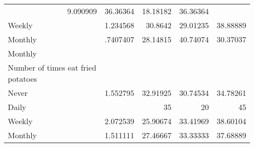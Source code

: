 \documentclass{article}
\begin{document}
\begin{tabular}{lllll}
  \multicolumn{1}{|r}{9.090909} &
  \multicolumn{1}{r}{36.36364} &
  \multicolumn{1}{r}{18.18182} &
  \multicolumn{1}{r}{36.36364} \\
\multicolumn{1}{l}{\hspace{5em}Weekly} &
  \multicolumn{1}{|r}{1.234568} &
  \multicolumn{1}{r}{30.8642} &
  \multicolumn{1}{r}{29.01235} &
  \multicolumn{1}{r}{38.88889} \\
\multicolumn{1}{l}{\hspace{5em}Monthly} &
  \multicolumn{1}{|r}{.7407407} &
  \multicolumn{1}{r}{28.14815} &
  \multicolumn{1}{r}{40.74074} &
  \multicolumn{1}{r}{30.37037} \\
\multicolumn{1}{l}{\hspace{3em}Monthly} &
  \multicolumn{1}{|r}{} &
  \multicolumn{1}{r}{} &
  \multicolumn{1}{r}{} &
  \multicolumn{1}{r}{} \\
\multicolumn{1}{l}{\hspace{4em}Number of times eat fried potatoes} &
  \multicolumn{1}{|r}{} &
  \multicolumn{1}{r}{} &
  \multicolumn{1}{r}{} &
  \multicolumn{1}{r}{} \\
\multicolumn{1}{l}{\hspace{5em}Never} &
  \multicolumn{1}{|r}{1.552795} &
  \multicolumn{1}{r}{32.91925} &
  \multicolumn{1}{r}{30.74534} &
  \multicolumn{1}{r}{34.78261} \\
\multicolumn{1}{l}{\hspace{5em}Daily} &
  \multicolumn{1}{|r}{} &
  \multicolumn{1}{r}{35} &
  \multicolumn{1}{r}{20} &
  \multicolumn{1}{r}{45} \\
\multicolumn{1}{l}{\hspace{5em}Weekly} &
  \multicolumn{1}{|r}{2.072539} &
  \multicolumn{1}{r}{25.90674} &
  \multicolumn{1}{r}{33.41969} &
  \multicolumn{1}{r}{38.60104} \\
\multicolumn{1}{l}{\hspace{5em}Monthly} &
  \multicolumn{1}{|r}{1.511111} &
  \multicolumn{1}{r}{27.46667} &
  \multicolumn{1}{r}{33.33333} &
  \multicolumn{1}{r}{37.68889} \\
\cline{1-5}
\end{tabular}
\end{document}

